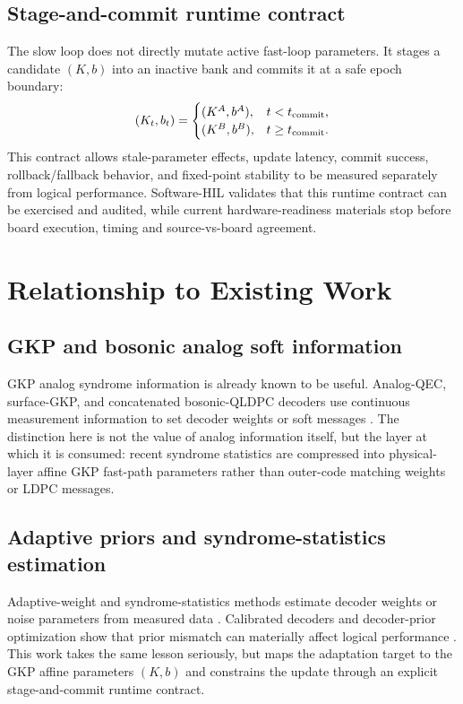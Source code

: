 \documentclass[11pt]{article}
\begin{document}
\subsection{Stage-and-commit runtime contract}

The slow loop does not directly mutate active fast-loop parameters.  It stages
a candidate \((K,b)\) into an inactive bank and commits it at a safe epoch
boundary:
\begin{equation}
(K_t,b_t)=
\begin{cases}
(K^A,b^A), & t<t_{\rm commit},\\
(K^B,b^B), & t\ge t_{\rm commit}.
\end{cases}
\end{equation}
This contract allows stale-parameter effects, update latency, commit success,
rollback/fallback behavior, and fixed-point stability to be measured
separately from logical performance.  Software-HIL validates that this runtime
contract can be exercised and audited, while current hardware-readiness
materials stop before board execution, timing and source-vs-board agreement.

\section{Relationship to Existing Work}

\subsection{GKP and bosonic analog soft information}

GKP analog syndrome information is already known to be useful.  Analog-QEC,
surface-GKP, and concatenated bosonic-QLDPC decoders use continuous
measurement information to set decoder weights or soft messages
\cite{fukui2018,noh2020,noh2022,raveendran2022,berent2024,borah2025}.  The
distinction here is not the value of analog information itself, but the layer
at which it is consumed: recent syndrome statistics are compressed into
physical-layer affine GKP fast-path parameters rather than outer-code matching
weights or LDPC messages.

\subsection{Adaptive priors and syndrome-statistics estimation}

Adaptive-weight and syndrome-statistics methods estimate decoder weights or
noise parameters from measured data \cite{spitz2018,wagner2021,dgr2023}.
Calibrated decoders and decoder-prior optimization show that prior mismatch can
materially affect logical performance \cite{chen2022,sivak2024}.  This work
takes the same lesson seriously, but maps the adaptation target to the GKP
affine parameters \((K,b)\) and constrains the update through an explicit
stage-and-commit runtime contract.
\end{document}
